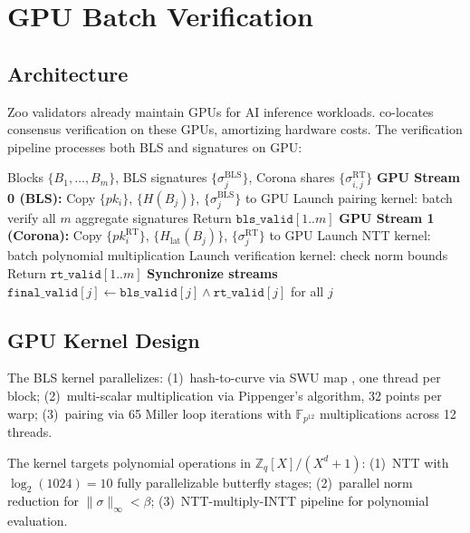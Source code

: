 \section{GPU Batch Verification}


\subsection{Architecture}

Zoo validators already maintain GPUs for AI inference workloads. \Quasar{} co-locates consensus verification on these GPUs, amortizing hardware costs. The verification pipeline processes both BLS and \Corona{} signatures on GPU:

\begin{algorithm}
\caption{GPU Dual-Path Batch Verification}
\begin{algorithmic}[1]
\REQUIRE Blocks $\{B_1, \ldots, B_m\}$, BLS signatures $\{\sigma^{\text{BLS}}_j\}$, Corona shares $\{\sigma^{\text{RT}}_{i,j}\}$
\STATE \textbf{GPU Stream 0 (BLS):}
\STATE \quad Copy $\{pk_i\}$, $\{H(B_j)\}$, $\{\sigma^{\text{BLS}}_j\}$ to GPU
\STATE \quad Launch pairing kernel: batch verify all $m$ aggregate signatures
\STATE \quad Return $\texttt{bls\_valid}[1..m]$
\STATE \textbf{GPU Stream 1 (Corona):}
\STATE \quad Copy $\{pk^{\text{RT}}_i\}$, $\{H_{\text{lat}}(B_j)\}$, $\{\sigma^{\text{RT}}_j\}$ to GPU
\STATE \quad Launch NTT kernel: batch polynomial multiplication
\STATE \quad Launch verification kernel: check norm bounds
\STATE \quad Return $\texttt{rt\_valid}[1..m]$
\STATE \textbf{Synchronize streams}
\STATE $\texttt{final\_valid}[j] \leftarrow \texttt{bls\_valid}[j] \wedge \texttt{rt\_valid}[j]$ for all $j$
\end{algorithmic}
\end{algorithm}

\subsection{GPU Kernel Design}

The BLS kernel parallelizes: (1)~hash-to-curve via SWU map \cite{wahby2019fast}, one thread per block; (2)~multi-scalar multiplication via Pippenger's algorithm, 32 points per warp; (3)~pairing via 65 Miller loop iterations with $\mathbb{F}_{p^{12}}$ multiplications across 12 threads.

The \Corona{} kernel targets polynomial operations in $\mathbb{Z}_q[X]/(X^d + 1)$: (1)~NTT with $\log_2(1024) = 10$ fully parallelizable butterfly stages; (2)~parallel norm reduction for $\|\sigma\|_\infty < \beta$; (3)~NTT-multiply-INTT pipeline for polynomial evaluation.

